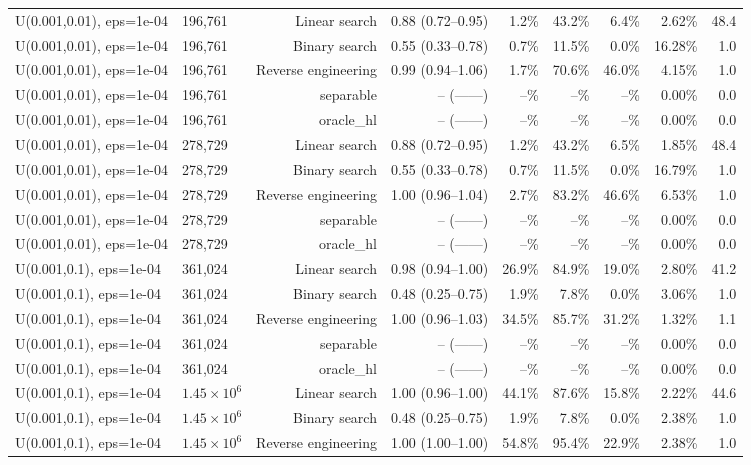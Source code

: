 \begin{tabular}{llrrrrrrr}
U(0.001,0.01), eps=1e-04 & 196,761 & Linear search & 0.88 (0.72--0.95) & 1.2\% & 43.2\% & 6.4\% & 2.62\% & 48.4 \\
U(0.001,0.01), eps=1e-04 & 196,761 & Binary search & 0.55 (0.33--0.78) & 0.7\% & 11.5\% & 0.0\% & 16.28\% & 1.0 \\
U(0.001,0.01), eps=1e-04 & 196,761 & Reverse engineering & 0.99 (0.94--1.06) & 1.7\% & 70.6\% & 46.0\% & 4.15\% & 1.0 \\
U(0.001,0.01), eps=1e-04 & 196,761 & separable & -- (------) & --\% & --\% & --\% & 0.00\% & 0.0 \\
U(0.001,0.01), eps=1e-04 & 196,761 & oracle_hl & -- (------) & --\% & --\% & --\% & 0.00\% & 0.0 \\
U(0.001,0.01), eps=1e-04 & 278,729 & Linear search & 0.88 (0.72--0.95) & 1.2\% & 43.2\% & 6.5\% & 1.85\% & 48.4 \\
U(0.001,0.01), eps=1e-04 & 278,729 & Binary search & 0.55 (0.33--0.78) & 0.7\% & 11.5\% & 0.0\% & 16.79\% & 1.0 \\
U(0.001,0.01), eps=1e-04 & 278,729 & Reverse engineering & 1.00 (0.96--1.04) & 2.7\% & 83.2\% & 46.6\% & 6.53\% & 1.0 \\
U(0.001,0.01), eps=1e-04 & 278,729 & separable & -- (------) & --\% & --\% & --\% & 0.00\% & 0.0 \\
U(0.001,0.01), eps=1e-04 & 278,729 & oracle_hl & -- (------) & --\% & --\% & --\% & 0.00\% & 0.0 \\
U(0.001,0.1), eps=1e-04 & 361,024 & Linear search & 0.98 (0.94--1.00) & 26.9\% & 84.9\% & 19.0\% & 2.80\% & 41.2 \\
U(0.001,0.1), eps=1e-04 & 361,024 & Binary search & 0.48 (0.25--0.75) & 1.9\% & 7.8\% & 0.0\% & 3.06\% & 1.0 \\
U(0.001,0.1), eps=1e-04 & 361,024 & Reverse engineering & 1.00 (0.96--1.03) & 34.5\% & 85.7\% & 31.2\% & 1.32\% & 1.1 \\
U(0.001,0.1), eps=1e-04 & 361,024 & separable & -- (------) & --\% & --\% & --\% & 0.00\% & 0.0 \\
U(0.001,0.1), eps=1e-04 & 361,024 & oracle_hl & -- (------) & --\% & --\% & --\% & 0.00\% & 0.0 \\
U(0.001,0.1), eps=1e-04 & $1.45\times 10^{6}$ & Linear search & 1.00 (0.96--1.00) & 44.1\% & 87.6\% & 15.8\% & 2.22\% & 44.6 \\
U(0.001,0.1), eps=1e-04 & $1.45\times 10^{6}$ & Binary search & 0.48 (0.25--0.75) & 1.9\% & 7.8\% & 0.0\% & 2.38\% & 1.0 \\
U(0.001,0.1), eps=1e-04 & $1.45\times 10^{6}$ & Reverse engineering & 1.00 (1.00--1.00) & 54.8\% & 95.4\% & 22.9\% & 2.38\% & 1.0 \\

\end{tabular}
